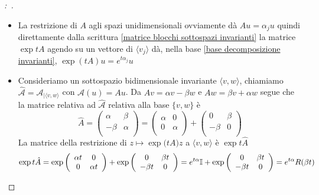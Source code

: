 \documentclass[11pt,a4paper,twoside]{book}
\newenvironment{dimo}[1][\proofname]{
	\begin{tcolorbox}[
	breakable, 
	enhanced, 
	interior hidden, 
	frame hidden, 
	borderline west = {1pt}{0pt}{gray}, 
	top=0pt, bottom=0pt, left=0pt]
\begin{proof}[#1:~]
}
{
\end{proof}
\end{tcolorbox}
}
\theoremstyle{esss}
\theoremstyle{dotless}
\numberwithin{equation}{section} %
\begin{document}
\begin{dimo}$ $
\begin{itemize} 
\item La restrizione di $A$ agli spazi unidimensionali ovviamente dà $Au=\alpha_j u$ quindi direttamente dalla scrittura \eqref{matrice blocchi sottospazi invarianti} la matrice $\exp{tA}$ agendo su un vettore di $\langle v_j \rangle$ dà, nella base \eqref{base decomposizione invarianti}, $\exp{(tA)} u= e^{t\alpha_j}u$
\item Consideriamo un sottospazio bidimensionale invariante $\langle v,w \rangle$, chiamiamo $\hat{\mathcal{A}}=\mathcal{A}_{|\langle v,w \rangle}$ con $\mathcal{A}(u)=Au$.
Da $Av=\alpha v -\beta w$ e $Aw=\beta v + \alpha w$ segue che la matrice relativa ad $\hat{\mathcal{A}}$ relativa alla base $\{v,w\}$ è 
\[
\hat{A}=\left( \begin{array}{cc}
\alpha & \beta \\
-\beta & \alpha \\
\end{array}\right) = \left( \begin{array}{cc}
\alpha & 0 \\
0 & \alpha \\
\end{array}\right)+\left( \begin{array}{cc}
0 & \beta \\
-\beta & 0 \\
\end{array}\right)
\]
La matrice della restrizione di $z\mapsto \exp{(tA})z$ a $\langle v, w \rangle$ è $\exp{t\hat{A}}$  
\[
\exp{t\hat{A}}=\exp{  \left( \begin{array}{cc}
\alpha t & 0 \\
0 & \alpha t \\
\end{array}\right) } + \exp{ \left( \begin{array}{cc}
0 & \beta t \\
-\beta t & 0 \\
\end{array}\right)  } =e^{t\alpha}\mathbb{I}+\exp{ \left( \begin{array}{cc}
0 & \beta t \\
-\beta t & 0 \\
\end{array}\right)  }= e^{t\alpha}R(\beta t) \qedhere
\] 
\end{itemize}
\end{dimo}
\end{document}
